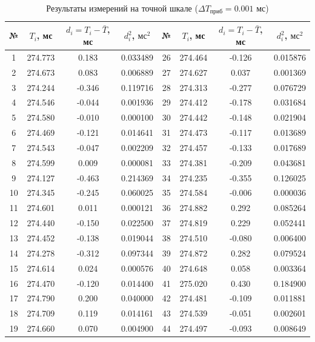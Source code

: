 \begin{table}[H]
\centering
\caption{Результаты измерений на точной шкале ($\Delta T_{\text{приб}} = 0.001$ мс)}
\label{tabl:2}
\vspace{2mm}

\begin{tabular}{|c|c|c|c||c|c|c|c|}
\hline
№ & $T_i$, мс & $d_i = T_i - \bar{T}$, мс & $d_i^2$, $\text{мс}^2$ & № & $T_i$, мс & $d_i = T_i - \bar{T}$, мс & $d_i^2$, $\text{мс}^2$ \\
\hline
1 & 274.773 & 0.183 & 0.033489 & 26 & 274.464 & -0.126 & 0.015876 \\
2 & 274.673 & 0.083 & 0.006889 & 27 & 274.627 & 0.037 & 0.001369 \\
3 & 274.244 & -0.346 & 0.119716 & 28 & 274.313 & -0.277 & 0.076729 \\
4 & 274.546 & -0.044 & 0.001936 & 29 & 274.412 & -0.178 & 0.031684 \\
5 & 274.580 & -0.010 & 0.000100 & 30 & 274.442 & -0.148 & 0.021904 \\
6 & 274.469 & -0.121 & 0.014641 & 31 & 274.473 & -0.117 & 0.013689 \\
7 & 274.543 & -0.047 & 0.002209 & 32 & 274.457 & -0.133 & 0.017689 \\
8 & 274.599 & 0.009 & 0.000081 & 33 & 274.381 & -0.209 & 0.043681 \\
9 & 274.127 & -0.463 & 0.214369 & 34 & 274.235 & -0.355 & 0.126025 \\
10 & 274.345 & -0.245 & 0.060025 & 35 & 274.584 & -0.006 & 0.000036 \\
11 & 274.601 & 0.011 & 0.000121 & 36 & 274.882 & 0.292 & 0.085264 \\
12 & 274.440 & -0.150 & 0.022500 & 37 & 274.819 & 0.229 & 0.052441 \\
13 & 274.452 & -0.138 & 0.019044 & 38 & 274.510 & -0.080 & 0.006400 \\
14 & 274.278 & -0.312 & 0.097344 & 39 & 274.872 & 0.282 & 0.079524 \\
15 & 274.614 & 0.024 & 0.000576 & 40 & 274.648 & 0.058 & 0.003364 \\
16 & 274.470 & -0.120 & 0.014400 & 41 & 275.020 & 0.430 & 0.184900 \\
17 & 274.790 & 0.200 & 0.040000 & 42 & 274.481 & -0.109 & 0.011881 \\
18 & 274.709 & 0.119 & 0.014161 & 43 & 274.539 & -0.051 & 0.002601 \\
19 & 274.660 & 0.070 & 0.004900 & 44 & 274.497 & -0.093 & 0.008649 \\

\end{tabular}
\end{table}
